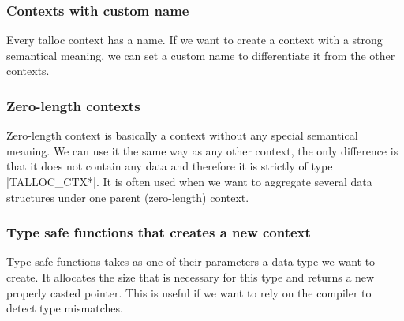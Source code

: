 \subsubsection{Contexts with custom name}

Every talloc context has a name.
If we want to create a context with a strong semantical meaning, we can set a
custom name to differentiate it from the other contexts.

% 
% 

\subsubsection{Zero-length contexts}

Zero-length context is basically a context without any special semantical
meaning. We can use it the same way as any other context, the only difference is
that it does not contain any data and therefore it is strictly of type
|TALLOC_CTX*|. It is often used when we want to aggregate several data
structures under one parent (zero-length) context.


\subsubsection{Type safe functions that creates a new context}

Type safe functions takes as one of their parameters a data type we want to
create. It allocates the size that is necessary for this type and returns a new
properly casted pointer. This is useful if we want to rely on the compiler to
detect type mismatches.

